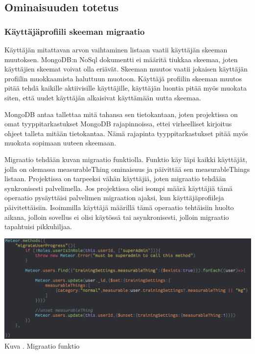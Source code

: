 \subsection{Ominaisuuden totetus}


\subsubsection{Käyttäjäprofiili skeeman migraatio}



Käyttäjän mitattavan arvon vaihtaminen listaan vaatii käyttäjän skeeman muutoksen.
MongoDB:n NoSql dokumentti ei määritä tiukkaa skeemaa, joten käyttäjien skeemat voivat olla eriävät.
Skeeman muutos vaatii jokaisen käyttäjän profiilin muokkaamista haluttuun muotoon.
Käyttäjä profiilin skeeman muutos pitää tehdä kaikille aktiivisille käyttäjille, käyttäjän luontia pitää myös muokata siten, 
että uudet käyttäjän alkaisivat käyttämään uutta skeemaa.
\medskip

MongoDB antaa tallettaa mitä tahansa sen tietokantaan, joten projektissa on omat tyyppitarkastukset MongoDB rajapinnoissa, 
ettei virheelliset kirjoitus ohjeet talleta mitään tietokantaa.
Nämä rajapinta tyyppitarkastukset pitää myös muokata sopimaan uuteen skeemaan.
\medskip

Migraatio tehdään kuvan \nextImageCount {} migraatio funktiolla. 
Funktio käy läpi kaikki käyttäjät, jolla on olemassa measurableThing ominaisuus ja päivittää sen measurableThings listaan.
Projektissa on tarpeeksi vähän käyttäjiä, joten migraatio tehdään synkronisesti palvelimella. 
Jos projektissa olisi isompi määrä käyttäjiä tämä operaatio pysäyttäisi palvelimen migraation ajaksi, kun käyttäjäprofiileja päivitettäisiin.
Isoimmilla käyttäjä määrillä tämä operaatio tehtäisiin huolto aikana, jolloin sovellus ei olisi käytössä tai asynkronisesti, 
jolloin migraatio tapahtuisi pikkuhiljaa. 
\medskip

\bigskip
\includegraphics[width =15cm]{src/public/oppar/migrationfunction.png}\\
Kuva \getImgCount{}. Migraatio funktio
\medskip







